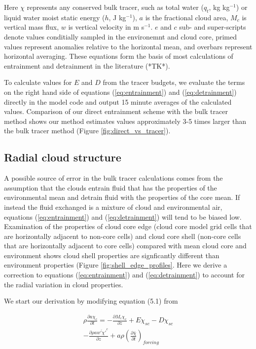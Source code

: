 \documentclass[12pt]{article}
\begin{document}
Here $\chi$ represents any conserved bulk tracer, such as total water ($q_t$, 
kg kg$^{-1}$) or liquid water moist static energy ($h$, J kg$^{-1}$), $a$ is 
the fractional cloud area, $M_c$ is vertical mass flux, $w$ is vertical 
velocity in m s$^{-1}$.  $e$ and $c$ sub- and super-scripts denote values 
conditially sampled in the environemnt and cloud core, primed values represent 
anomalies relative to the horizontal mean, and overbars represent horizontal 
averaging.  These equations form the basis of most calculations of entrainment 
and detrainment in the literature (*TK*).

To calculate values for $E$ and $D$ from the tracer budgets, we evaluate the 
terms on the right hand side of equations (\ref{eq:entrainment}) and 
(\ref{eq:detrainment}) directly in the model code and output 15 minute averages 
of the calculated values.  Comparison of our direct entrainment scheme with 
the bulk tracer method shows our method estimates values approximately 3-5 
times larger than the bulk tracer method (Figure \ref{fig:direct_vs_tracer}).


\subsection{Radial cloud structure}

A possible source of error in the bulk tracer calculations comes from the 
assumption that the clouds entrain fluid that has the properties of the 
environmental mean and detrain fluid with the properties of the core mean. 
If instead the fluid exchanged is a mixture of cloud and environmental air, 
equations (\ref{eq:entrainment}) and (\ref{eq:detrainment}) will tend to 
be biased low.  Examination of the properties of cloud core edge (cloud core 
model grid cells that are horizontally adjacent to non-core cells) and cloud 
core shell (non-core cells that are horizontally adjacent to core cells) 
compared with mean cloud core and environment shows cloud shell properties 
are signficantly different than environment properties (Figure 
\ref{fig:shell_edge_profiles}.  Here we derive a correction to equations 
(\ref{eq:entrainment}) and (\ref{eq:detrainment}) to account for the radial 
variation in cloud properties.

We start our derivation by modifying equation (5.1) from \cite{Siebesma1995}

\begin{equation}
  \label{eq:derivation_entrainment}
  \begin{split}
    \rho \frac{\partial a \chi_c}{\partial t} 
    = - \frac{\partial M_c \chi_c}{\partial z} 
    + E \chi_{se} - D \chi_{sc} \\
    - \frac{\partial \rho a \overline{w' \chi'}^c}{\partial z} 
    + a \rho \left(\frac{\partial \bar{\chi}}{\partial t}\right)_{forcing}
  \end{split}
\end{equation}
\end{document}

